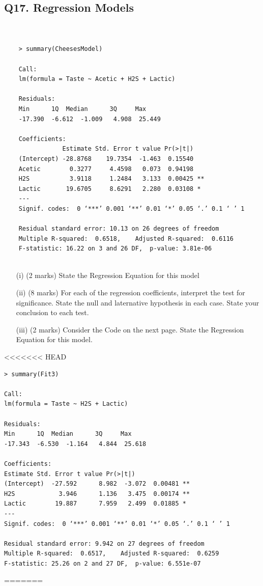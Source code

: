 \documentclass[a4paper,12pt]{article}
\begin{document}
\subsection*{Q17. Regression Models}
\begin{framed}
	\begin{verbatim}
	
	
	> summary(CheesesModel)
	
	Call:
	lm(formula = Taste ~ Acetic + H2S + Lactic)
	
	Residuals:
	Min      1Q  Median      3Q     Max 
	-17.390  -6.612  -1.009   4.908  25.449 
	
	Coefficients:
	            Estimate Std. Error t value Pr(>|t|)   
	(Intercept) -28.8768    19.7354  -1.463  0.15540   
	Acetic        0.3277     4.4598   0.073  0.94198   
	H2S           3.9118     1.2484   3.133  0.00425 **
	Lactic       19.6705     8.6291   2.280  0.03108 * 
	---
	Signif. codes:  0 ‘***’ 0.001 ‘**’ 0.01 ‘*’ 0.05 ‘.’ 0.1 ‘ ’ 1
	
	Residual standard error: 10.13 on 26 degrees of freedom
	Multiple R-squared:  0.6518,    Adjusted R-squared:  0.6116 
	F-statistic: 16.22 on 3 and 26 DF,  p-value: 3.81e-06
	
	\end{verbatim}
\end{framed}
\begin{itemize}
	\item[(i)] (2 marks)
	State the Regression Equation for this model
	\item[(ii)] (8 marks) For each of the regression coefficients, interpret the test for significance. State the null and laternative hypothesis in each case. State your conclusion to each test.
 \item[(iii)] (2 marks) Consider the Code on the next page. State the Regression Equation for this model.
	
\end{itemize}

\newpage

<<<<<<< HEAD
\begin{framed}
\begin{verbatim}
> summary(Fit3)

Call:
lm(formula = Taste ~ H2S + Lactic)

Residuals:
Min      1Q  Median      3Q     Max 
-17.343  -6.530  -1.164   4.844  25.618 

Coefficients:
Estimate Std. Error t value Pr(>|t|)   
(Intercept)  -27.592      8.982  -3.072  0.00481 **
H2S            3.946      1.136   3.475  0.00174 **
Lactic        19.887      7.959   2.499  0.01885 * 
---
Signif. codes:  0 ‘***’ 0.001 ‘**’ 0.01 ‘*’ 0.05 ‘.’ 0.1 ‘ ’ 1

Residual standard error: 9.942 on 27 degrees of freedom
Multiple R-squared:  0.6517,    Adjusted R-squared:  0.6259 
F-statistic: 25.26 on 2 and 27 DF,  p-value: 6.551e-07

\end{verbatim}
\end{framed}
=======
\end{document}
